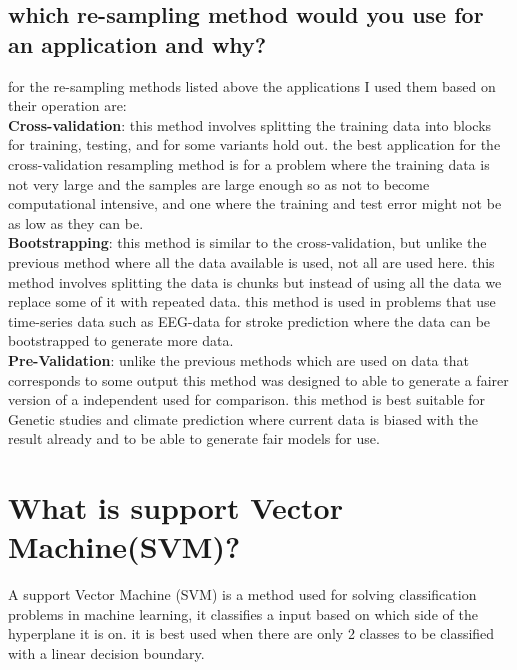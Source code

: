 \documentclass[a4paper,12pt]{report}
\begin{document}
\subsection{which re-sampling method would you use for an application and why?}
for the re-sampling methods listed above the applications I used them based on their operation are:
\vspace{0.5cm}\\
\textbf{Cross-validation}: this method involves splitting the training data into blocks for training, testing, and for some variants hold out.
the best application for the cross-validation resampling method is for a problem where the training data is not very large and the samples are large enough so as not to become computational intensive, and one where the training and test error might not be as low as they can be.
\vspace{0.5cm}\\
\textbf{Bootstrapping}: this method is similar to the cross-validation, but unlike the previous method where all the data available is used, not all are used here. this method involves splitting the data is chunks but instead of using all the data we replace some of it with repeated data. this method is used in problems that use time-series data such as EEG-data for stroke prediction where the data can be bootstrapped to generate more data.
\vspace{0.5cm}\\
\textbf{Pre-Validation}: unlike the previous methods which are used on data that corresponds to some output this method was designed to able to generate a fairer version of a independent used for comparison. this method is best suitable for Genetic studies and climate prediction where current data is biased with the result already and to be able to generate fair models for use.

\section{What is support Vector Machine(SVM)?}
A support Vector Machine (SVM) is a method used for solving classification problems in machine learning, it classifies a input based on which side of the hyperplane it is on. it is best used when there are only 2 classes to be classified with a linear decision boundary.
\end{document}
